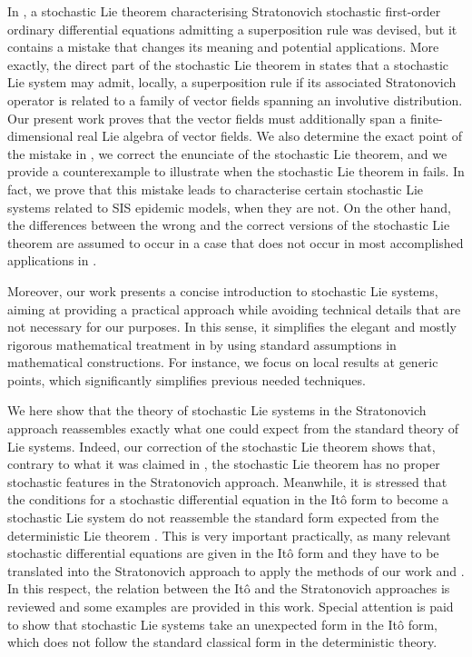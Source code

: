 \documentclass[11pt]{article}
\theoremstyle{plain}
\theoremstyle{definition}
\begin{document}
In \cite{LO09}, a stochastic Lie theorem  characterising Stratonovich stochastic first-order ordinary differential equations admitting a superposition rule was devised, but it contains a mistake that  changes its meaning and potential applications. More exactly, the direct part of the stochastic Lie theorem in \cite{LO09} states that a stochastic Lie system may admit, locally, a superposition rule if its associated Stratonovich operator is related to a family of vector fields spanning an involutive distribution. Our present work proves that the vector fields must additionally span a finite-dimensional real Lie algebra of vector fields. We also determine the exact point of the mistake in \cite{LO09}, we correct the enunciate of the stochastic Lie theorem, and we provide a counterexample to illustrate when the stochastic Lie theorem in \cite{LO09} fails. In fact, we prove that this mistake  leads to characterise certain stochastic Lie systems related to SIS epidemic models, when they are not. 
On the other hand, the differences between the wrong and the correct versions of the stochastic Lie theorem are assumed to occur in a case that does not occur in most accomplished applications in \cite{LO09}.%

Moreover, our work presents a concise introduction to stochastic Lie systems, aiming at providing a practical approach while avoiding  technical details that are not necessary for our purposes. In this sense, it simplifies the elegant and mostly rigorous mathematical treatment in  \cite{LO09} by using standard assumptions in mathematical constructions. For instance, we focus on local results at generic points, which significantly simplifies previous needed techniques. 

We here show that the theory of stochastic Lie systems in the Stratonovich approach reassembles exactly what one could expect from the standard theory of Lie systems. Indeed, our correction of the stochastic Lie theorem shows that, contrary to what it was claimed in \cite{LO09}, the stochastic Lie theorem has no proper stochastic features in the Stratonovich approach. Meanwhile, it is stressed that the conditions for a stochastic differential equation in the It\^{o} form \cite{Ka81} to become a stochastic Lie system do not reassemble the standard form expected from the deterministic Lie theorem \cite{CGM00,CGM07,Dissertationes}. This is very important practically, as many relevant stochastic differential equations are given in the It\^o form and they have to be translated into the Stratonovich approach \cite{Sa70} to apply the methods of our work and \cite{LO09}. In this respect, the relation between the It\^o and the Stratonovich approaches is reviewed and some examples are provided in this work. Special attention is paid to show that stochastic Lie systems take an unexpected form in the It\^{o} form, which does not follow the standard classical form in the deterministic theory. %
\end{document}
